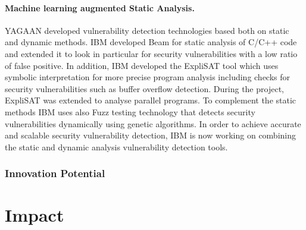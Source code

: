 \documentclass[a4paper,11pt]{article}
\begin{document}
\paragraph{\YAGshort{} Machine learning augmented Static Analysis.}

YAGAAN developed vulnerability detection technologies based both on static and dynamic methods. IBM developed Beam for static analysis of C/C++ code and extended it to look in particular for security vulnerabilities with a low ratio of false positive. In addition, IBM developed the ExpliSAT tool which uses symbolic interpretation for more precise program analysis including checks for security vulnerabilities such as buffer overflow detection. During the \rephrase{} project, ExpliSAT was extended to analyse parallel programs. To complement the static methods IBM uses also Fuzz testing technology that detects security vulnerabilities dynamically using genetic algorithms. In order to achieve accurate and scalable security vulnerability detection, IBM is now working on combining the static and dynamic analysis vulnerability detection tools.     



\subsubsection{Innovation Potential}
\label{sec:innovationpotential}
\label{innovationpotential}


\clearpage
\section{Impact}
\label{sec:impact}



\end{document}
